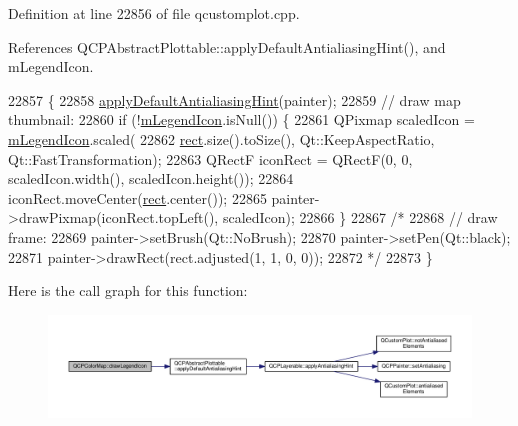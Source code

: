 Definition at line 22856 of file qcustomplot.\+cpp.



References Q\+C\+P\+Abstract\+Plottable\+::apply\+Default\+Antialiasing\+Hint(), and m\+Legend\+Icon.


\begin{DoxyCode}
22857                                                            \{
22858   \hyperlink{class_q_c_p_abstract_plottable_a76e9d6cc7972dc1528f526d163766aca}{applyDefaultAntialiasingHint}(painter);
22859   \textcolor{comment}{// draw map thumbnail:}
22860   \textcolor{keywordflow}{if} (!\hyperlink{class_q_c_p_color_map_ada522988db02cb531767d38c5029ef60}{mLegendIcon}.isNull()) \{
22861     QPixmap scaledIcon = \hyperlink{class_q_c_p_color_map_ada522988db02cb531767d38c5029ef60}{mLegendIcon}.scaled(
22862         \hyperlink{_gen_blob_8m_aea8f6815d9a63491fc422c5572c6b3c3}{rect}.size().toSize(), Qt::KeepAspectRatio, Qt::FastTransformation);
22863     QRectF iconRect = QRectF(0, 0, scaledIcon.width(), scaledIcon.height());
22864     iconRect.moveCenter(\hyperlink{_gen_blob_8m_aea8f6815d9a63491fc422c5572c6b3c3}{rect}.center());
22865     painter->drawPixmap(iconRect.topLeft(), scaledIcon);
22866   \}
22867   \textcolor{comment}{/*}
22868 \textcolor{comment}{  // draw frame:}
22869 \textcolor{comment}{  painter->setBrush(Qt::NoBrush);}
22870 \textcolor{comment}{  painter->setPen(Qt::black);}
22871 \textcolor{comment}{  painter->drawRect(rect.adjusted(1, 1, 0, 0));}
22872 \textcolor{comment}{  */}
22873 \}
\end{DoxyCode}


Here is the call graph for this function\+:\nopagebreak
\begin{figure}[H]
\begin{center}
\leavevmode
\includegraphics[width=350pt]{class_q_c_p_color_map_a7d5eee89f6b8eaf2f11f1d94e32215b2_cgraph}
\end{center}
\end{figure}


\hypertarget{class_q_c_p_color_map_a0d89371f8707f12e22737b863f1a5126}{}
